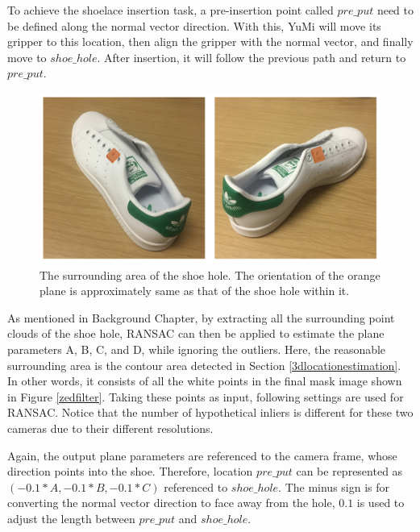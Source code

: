 To achieve the shoelace insertion task, a pre-insertion point called $pre\_put$ need to be defined along the normal vector direction. With this, YuMi will move its gripper to this location, then align the gripper with the normal vector, and finally move to $shoe\_hole$. After insertion, it will follow the previous path and return to $pre\_put$.

\begin{figure}[H]
\centering
\includegraphics[width = 0.7\columnwidth]{Implementation/cv/plane.png}
\caption{The surrounding area of the shoe hole. The orientation of the orange plane is approximately same as that of the shoe hole within it.}
\label{plane}
\end{figure}

As mentioned in Background Chapter, by extracting all the surrounding point clouds of the shoe hole, RANSAC can then be applied to estimate the plane parameters A, B, C, and D, while ignoring the outliers. Here, the reasonable surrounding area is the contour area detected in Section \ref{3dlocationestimation}. In other words, it consists of all the white points in the final mask image shown in Figure \ref{zedfilter}. Taking these points as input, following settings are used for RANSAC. Notice that the number of hypothetical inliers is different for these two cameras due to their different resolutions.

\begin{table}[H]
\centering
{}
\caption{RANSAC parameters setting}
\label{ransacsetting}
\end{table}

Again, the output plane parameters are referenced to the camera frame, whose direction points into the shoe. Therefore, location $pre\_put$ can be represented as $(-0.1*A, -0.1*B, -0.1*C)$ referenced to $shoe\_hole$. The minus sign is for converting the normal vector direction to face away from the hole, $0.1$ is used to adjust the length between $pre\_put$ and $shoe\_hole$.

